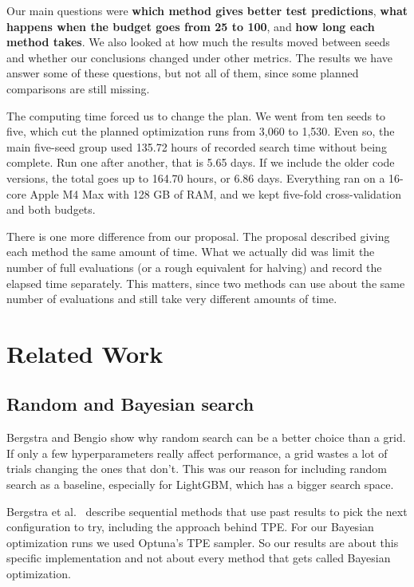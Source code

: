 \documentclass[12pt,letterpaper]{article}
\begin{document}
Our main questions were \textbf{which method gives better test predictions}, \textbf{what happens when the budget goes from 25 to 100}, and \textbf{how long each method takes}. We also looked at how much the results moved between seeds and whether our conclusions changed under other metrics. The results we have answer some of these questions, but not all of them, since some planned comparisons are still missing.

The computing time forced us to change the plan. We went from ten seeds to five, which cut the planned optimization runs from 3,060 to 1,530. Even so, the main five-seed group used 135.72 hours of recorded search time without being complete. Run one after another, that is 5.65 days. If we include the older code versions, the total goes up to 164.70 hours, or 6.86 days. Everything ran on a 16-core Apple M4 Max with 128 GB of RAM, and we kept five-fold cross-validation and both budgets.

There is one more difference from our proposal. The proposal described giving each method the same amount of time. What we actually did was limit the number of full evaluations (or a rough equivalent for halving) and record the elapsed time separately. This matters, since two methods can use about the same number of evaluations and still take very different amounts of time.

\section{Related Work}\label{related-work}

\subsection{Random and Bayesian search}\label{random-and-bayesian-search}

Bergstra and Bengio \cite{bergstra12} show why random search can be a better choice than a grid. If only a few hyperparameters really affect performance, a grid wastes a lot of trials changing the ones that don't. This was our reason for including random search as a baseline, especially for LightGBM, which has a bigger search space.

Bergstra et al.~\cite{bergstra11} describe sequential methods that use past results to pick the next configuration to try, including the approach behind TPE. For our Bayesian optimization runs we used Optuna's TPE sampler. So our results are about this specific implementation and not about every method that gets called Bayesian optimization.
\end{document}

